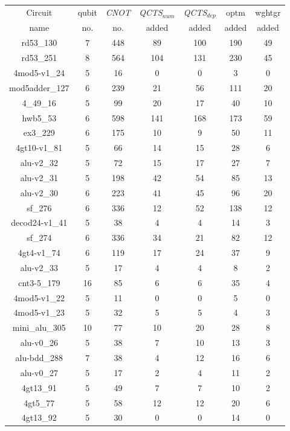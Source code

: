 \documentclass[runningheads]{llncs}
\begin{document}
	\begin{table}[H]
		\begin{center}  
		\begin{tabular}{|c|c|c|c|c|c|c|}
		\hline
		Circuit &  qubit  & \textit{CNOT} &\textit{QCTS$_{num}$}& \textit{QCTS$_{dep}$}  & optm 	 & wghtgr 	\\
		 name	&   no. 	&	no. & added&  added &  added 	&  added\\
		\hline
		rd53\_130 & 7 & 448 & 89 & 100 & 190 & 49 \\ 
rd53\_251 & 8 & 564 & 104 & 131 & 230 & 45 \\ 
4mod5-v1\_24 & 5 & 16 & 0 & 0 & 3 & 0 \\ 
mod5adder\_127 & 6 & 239 & 21 & 56 & 111 & 20 \\ 
4\_49\_16 & 5 & 99 & 20 & 17 & 40 & 10 \\ 
hwb5\_53 & 6 & 598 & 141 & 168 & 173 & 59 \\ 
ex3\_229 & 6 & 175 & 10 & 9 & 50 & 11 \\ 
4gt10-v1\_81 & 5 & 66 & 14 & 15 & 28 & 6 \\ 
alu-v2\_32 & 5 & 72 & 15 & 17 & 27 & 7 \\ 
alu-v2\_31 & 5 & 198 & 42 & 54 & 85 & 13 \\ 
alu-v2\_30 & 6 & 223 & 41 & 45 & 96 & 20 \\ 
sf\_276 & 6 & 336 & 12 & 52 & 138 & 12 \\ 
decod24-v1\_41 & 5 & 38 & 4 & 4 & 14 & 3 \\ 
sf\_274 & 6 & 336 & 34 & 21 & 82 & 12 \\ 
4gt4-v1\_74 & 6 & 119 & 17 & 24 & 37 & 9 \\ 
alu-v2\_33 & 5 & 17 & 4 & 4 & 8 & 2 \\ 
cnt3-5\_179 & 16 & 85 & 6 & 6 & 35 & 4 \\ 
4mod5-v1\_22 & 5 & 11 & 0 & 0 & 5 & 0 \\ 
4mod5-v1\_23 & 5 & 32 & 5 & 5 & 4 & 3 \\ 
mini\_alu\_305 & 10 & 77 & 10 & 20 & 28 & 8 \\ 
alu-v0\_26 & 5 & 38 & 7 & 10 & 13 & 3 \\ 
alu-bdd\_288 & 7 & 38 & 4 & 12 & 16 & 6 \\ 
alu-v0\_27 & 5 & 17 & 2 & 4 & 11 & 2 \\ 
4gt13\_91 & 5 & 49 & 7 & 7 & 10 & 2 \\ 
4gt5\_77 & 5 & 58 & 12 & 12 & 20 & 6 \\ 
4gt13\_92 & 5 & 30 & 0 & 0 & 14 & 0 \\ 

\end{tabular}
\end{center}
\end{table}
\end{document}
